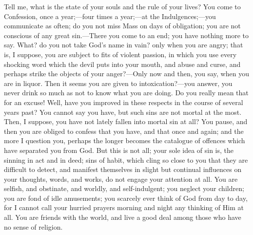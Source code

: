 Tell me, what is the state of your souls and the rule of your
lives? You come to Confession, once a year;—four times a year;—at
the Indulgences;—you communicate as often; do you not miss Mass on
days of obligation; you are not conscious of any great sin.—There
you come to an end; you have nothing more to say. What? do you not
take God's name in vain? only when you are angry; that is, I suppose,
you are subject to fits of violent passion, in which you use every
shocking word which the devil puts into your mouth, and abuse and
curse, and perhaps strike the objects of your anger?—Only now and
then, you say, when you are in liquor. Then it seems you are given to
intoxication?—you answer, you never drink so much as not to know
what you are doing. Do you really mean that for an excuse! Well, have
you improved in these respects in the course of several years past?
You cannot say you have, but such sins are not mortal at the most.
Then, I suppose, you have not lately fallen into mortal sin at all?
You pause, and then you are obliged to confess that you have, and that
once and again; and the more I question you, perhaps the longer
becomes the catalogue of offences which have separated you from God.
But this is not all; your sole idea of sin is, the sinning in act and
in deed; sins of habit, which cling so close to you that they are
difficult to detect, and manifest themselves in slight but continual
influences on your thoughts, words, and works, do not engage your
attention at all. You are selfish, and obstinate, and worldly, and
self-indulgent; you neglect your children; you are fond of idle
amusements; you scarcely ever think of God from day to day, for I
cannot call your hurried prayers morning and night any thinking of Him
at all. You are friends with the world, and live a good deal among
those who have no sense of religion.

